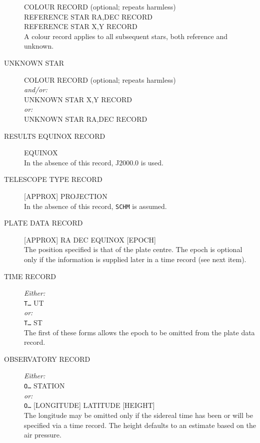 \documentclass[twoside,11pt]{article}
\newcommand{\xlabel}[1]{}
\renewcommand{\_}{\texttt{\symbol{95}}}
\begin{document}
\begin{description}
 COLOUR RECORD (optional; repeats harmless) \\
 REFERENCE STAR RA,DEC RECORD \\
 REFERENCE STAR X,Y RECORD \\
 A colour record applies to all subsequent stars,
 both reference and unknown.

\goodbreak
\item[\xlabel{UNKNOWN_STAR}UNKNOWN STAR]\mbox{}

 COLOUR RECORD (optional; repeats harmless) \\
 \textit{and/or:} \\
 UNKNOWN STAR X,Y RECORD \\
 \textit{or:} \\
 UNKNOWN STAR RA,DEC RECORD

\goodbreak
\item[\xlabel{RESULTS_EQUINOX_RECORD}RESULTS EQUINOX RECORD]\mbox{}

 EQUINOX \\
 In the absence of this record, J2000.0 is used.

\goodbreak
\item[\xlabel{TELESCOPE_TYPE_RECORD}TELESCOPE TYPE RECORD]\mbox{}

 [APPROX] PROJECTION \\
 In the absence of this record, \texttt{SCHM} is assumed.

\goodbreak
\item[\xlabel{PLATE_DATA_RECORD}PLATE DATA RECORD]\mbox{}

 [APPROX] RA DEC EQUINOX [EPOCH] \\
 The position specified is that of the plate centre.
 The epoch is optional only if the information is supplied
 later in a time record (see next item).

\goodbreak
\item[\xlabel{TIME_RECORD}TIME RECORD]\mbox{}

 \textit{Either:} \\
 \texttt{T\ldots} UT \\
 \textit{or:} \\
 \texttt{T\ldots} ST \\
 The first of these forms allows the epoch to be omitted from
 the plate data record.

\goodbreak
\item[\xlabel{OBSERVATORY_RECORD}OBSERVATORY RECORD]\mbox{}

 \textit{Either:} \\
 \texttt{O\ldots} STATION \\
 \textit{or:} \\
 \texttt{O\ldots} [LONGITUDE] LATITUDE [HEIGHT] \\
 The longitude may be omitted only if the sidereal
 time has been or will be specified via a time record.
 The height defaults to an estimate based on the air pressure.


\end{description}
\end{document}
